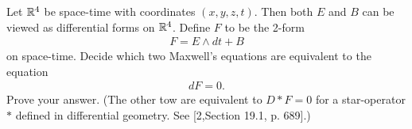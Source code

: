 \documentclass[12pt,a4paper]{report}
\begin{document}
\begin{enumerate}[label=19.\arabic*]
Let $\mathbb{R}^4$ be space-time with coordinates $(x,y,z,t)$.  Then both $E$ and $B$ can be viewed as differential forms on $\mathbb{R}^4$. Define $F$ to be the 2-form
\begin{align*}
	F=E \wedge dt +B
\end{align*}on space-time.  Decide which two Maxwell's equations are equivalent to the equation
\begin{align*}
	dF=0.
\end{align*}Prove your answer. (The other tow are equivalent to $D*F=0$ for a star-operator $*$ defined in differential geometry.  See [2,Section 19.1, p. 689].)
\end{enumerate}
\end{document}
